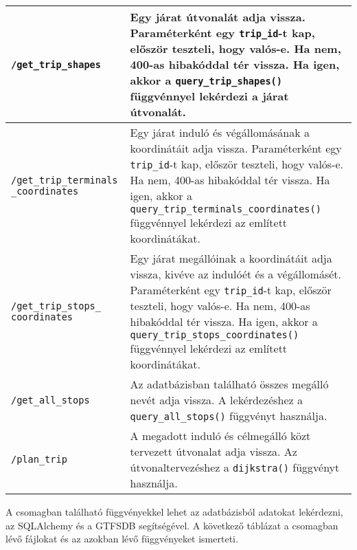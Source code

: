 \begin{longtable}{|p{4.5cm}|p{9cm}|}
\hline
\texttt{/get\_trip\_shapes} &
Egy járat útvonalát adja vissza. Paraméterként egy \texttt{trip\_id}-t kap, először teszteli, hogy valós-e. Ha nem, 400-as hibakóddal tér vissza. Ha igen, akkor a \texttt{query\_trip\_shapes()} függvénnyel lekérdezi a járat útvonalát. \\
\hline
\texttt{/get\_trip\_terminals} \texttt{\_coordinates} &
Egy járat induló és végállomásának a koordinátáit adja vissza. Paraméterként egy \texttt{trip\_id}-t kap, először teszteli, hogy valós-e. Ha nem, 400-as hibakóddal tér vissza. Ha igen, akkor a \texttt{query\_trip\_terminals\_coordinates()} függvénnyel lekérdezi az említett koordinátákat. \\
\hline
\texttt{/get\_trip\_stops\_} \texttt{coordinates} &
Egy járat megállóinak a koordinátáit adja vissza, kivéve az indulóét és a végállomásét. Paraméterként egy \texttt{trip\_id}-t kap, először teszteli, hogy valós-e. Ha nem, 400-as hibakóddal tér vissza. Ha igen, akkor a \texttt{query\_trip\_stops\_coordinates()} függvénnyel lekérdezi az említett koordinátákat. \\
\hline
\texttt{/get\_all\_stops} &
Az adatbázisban található összes megálló nevét adja vissza. A lekérdezéshez a \texttt{query\_all\_stops()} függvényt használja. \\
\hline
\texttt{/plan\_trip} &
A megadott induló és célmegálló közt tervezett útvonalat adja vissza. Az útvonaltervezéshez a \texttt{dijkstra()} függvényt használja. \\
\hline
\end{longtable}


A csomagban található függvényekkel lehet az adatbázisból adatokat lekérdezni, az SQLAlchemy és a GTFSDB segítségével. A következő táblázat a csomagban lévő fájlokat és az azokban lévő függvényeket ismerteti.

